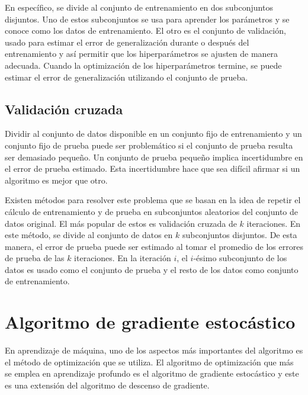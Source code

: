\vspace{1em}

En específico, se divide al conjunto de entrenamiento en dos subconjuntos disjuntos. Uno de estos subconjuntos se usa para aprender los parámetros y se conoce como los datos de entrenamiento. El otro es el conjunto de validación, usado para estimar el error de generalización durante o después del entrenamiento y así permitir que los hiperparámetros se ajusten de manera adecuada. Cuando la optimización de los hiperparámetros termine, se puede estimar el error de generalización utilizando el conjunto de prueba.
\cite{goodfellow-et-al-2016}
\cite{hastie01statisticallearning}

\subsection{Validación cruzada}
Dividir al conjunto de datos disponible en un conjunto fijo de entrenamiento y un conjunto fijo de prueba puede ser problemático si el conjunto de prueba resulta ser demasiado pequeño. Un conjunto de prueba pequeño implica incertidumbre en el error de prueba estimado. Esta incertidumbre hace que sea difícil afirmar si un algoritmo es mejor que otro. 

\vspace{1em}

Existen métodos para resolver este problema que se basan en la idea de repetir el cálculo de entrenamiento y de prueba en subconjuntos aleatorios del conjunto de datos original. El más popular de estos es validación cruzada de $k$ iteraciones. En este método, se divide al conjunto de datos en $k$ subconjuntos disjuntos. De esta manera, el error de prueba puede ser estimado al tomar el promedio de los errores de prueba de las $k$ iteraciones. En la iteración $i$, el $i$-ésimo subconjunto de los datos es usado como el conjunto de prueba y el resto de los datos como conjunto de entrenamiento.
\cite{goodfellow-et-al-2016}
\cite{hastie01statisticallearning}


\section{Algoritmo de gradiente estocástico}
En aprendizaje de máquina, uno de los aspectos más importantes del algoritmo es el método de optimización que se utiliza. El algoritmo de optimización que más se emplea en aprendizaje profundo es el algoritmo de gradiente estocástico y este es una extensión del algoritmo de descenso de gradiente. 

